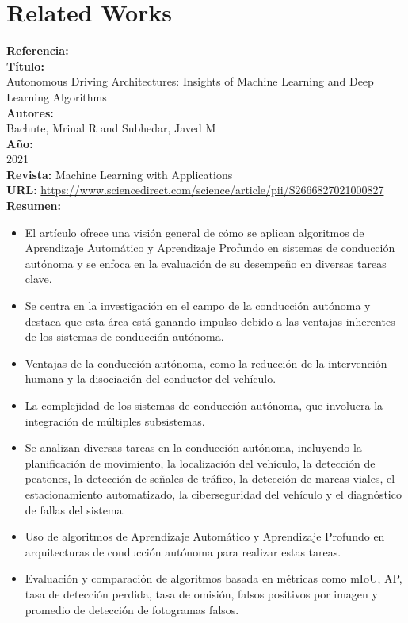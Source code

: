 \documentclass[10pt,letterpaper,final]{article}
\begin{document}
    \section*{Related Works}
    \newline
    \begin{longtable}
        \hline
        \noindent \textbf{Referencia:}~\cite{bachute2021autonomous} \\
        \textbf{Título:} \\
        Autonomous Driving Architectures: Insights of Machine Learning and Deep Learning Algorithms \\
        \textbf{Autores:}\\
        Bachute, Mrinal R and Subhedar, Javed M \\
        \textbf{Año:}\\
        2021 \\
        \textbf{Revista:}
        Machine Learning with Applications \\
        \textbf{URL:}
        \url{https://www.sciencedirect.com/science/article/pii/S2666827021000827}\\
        \textbf{Resumen:}
        \begin{itemize}
            \item El artículo ofrece una visión general de cómo se aplican algoritmos de Aprendizaje Automático y Aprendizaje
            Profundo en sistemas de conducción autónoma y se enfoca en la evaluación de su desempeño en diversas tareas clave.
            \item Se centra en la investigación en el campo de la conducción autónoma y destaca que esta área está ganando
            impulso debido a las ventajas inherentes de los sistemas de conducción autónoma.
            \item Ventajas de la conducción autónoma, como la reducción de la intervención humana y la disociación del conductor del vehículo.
            \item La complejidad de los sistemas de conducción autónoma, que involucra la integración de múltiples subsistemas.
            \item Se analizan diversas tareas en la conducción autónoma, incluyendo la planificación de movimiento, la localización del vehículo,
            la detección de peatones, la detección de señales de tráfico, la detección de marcas viales, el estacionamiento automatizado,
            la ciberseguridad del vehículo y el diagnóstico de fallas del sistema.
            \item Uso de algoritmos de Aprendizaje Automático y Aprendizaje Profundo en arquitecturas de conducción autónoma para realizar estas tareas.
            \item Evaluación y comparación de algoritmos basada en métricas como mIoU, AP, tasa de detección perdida, tasa de omisión,
            falsos positivos por imagen y promedio de detección de fotogramas falsos.
        \end{itemize}


\end{longtable}
\end{document}

